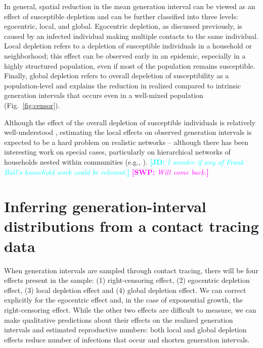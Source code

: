 \documentclass[12pt]{article}
\newcommand{\fref}[1]{Fig.~\ref{fig:#1}}
\newcommand{\comment}[3]{\textcolor{#1}{\textbf{[#2: }\textsl{#3}\textbf{]}}}
\newcommand{\jd}[1]{\comment{cyan}{JD}{#1}}
\newcommand{\swp}[1]{\comment{magenta}{SWP}{#1}}
\begin{document}
In general, spatial reduction in the mean generation interval can be viewed as an effect of susceptible depletion and can be further classified into three levels: egocentric, local, and global.
Egocentric depletion, as discussed previously, is caused by an infected individual making multiple contacts to the same individual.
Local depletion refers to a depletion of susceptible individuals in a household or neighborhood;
this effect can be observed early in an epidemic, especially in a highly structured population, even if most of the population remains susceptible.
Finally, global depletion refers to overall depeletion of susceptibility as a population-level and explains the reduction in realized compared to intrinsic generation intervals that occurs even in a well-mixed population (\fref{censor}). 

Although the effect of the overall depletion of susceptible individuals is relatively well-understood \citep{champredon2015intrinsic}, estimating the local effects on observed generation intervals is expected to be a hard problem on realistic networks -- although there has been interesting work on special cases, particularly on hierarchical networks of households nested within communities (e.g.,  \cite{tomba2010some}). \jd{I wonder if any of Frank Ball's household work could be relevant.}
\swp{Will come back.}

\section{Inferring generation-interval distributions from a contact tracing data}

When generation intervals are sampled through contact tracing, there will be four effects present in the sample: (1) right-censoring effect, (2) egocentric depletion effect, (3) local depletion effect and (4) global depletion effect.
We can correct explicitly for the egocentric effect and, in the case of exponential growth, the right-censoring effect.
While the other two effects are difficult to measure, we can make qualitative predictions about their effects on the realized generation intervals and estimated reproductive numbers: 
both local and global depletion effects reduce number of infections that occur and shorten generation intervals.
\end{document}
